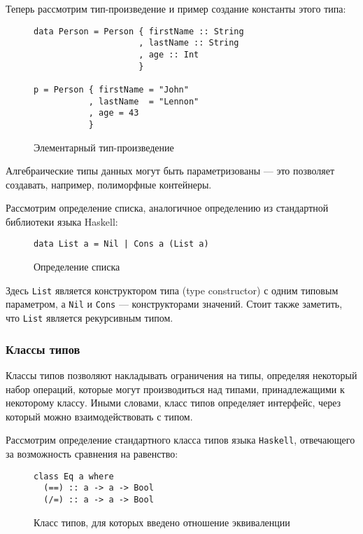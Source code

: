 Теперь рассмотрим тип-произведение и пример создание константы этого типа:

\begin{figure}[h]
\begin{lstlisting}
data Person = Person { firstName :: String
                     , lastName :: String
                     , age :: Int
                     }

p = Person { firstName = "John"
           , lastName  = "Lennon"
           , age = 43
           }
\end{lstlisting}
\caption{Элементарный тип-произведение}
\label{listing:Bool}
\end{figure}

Алгебраические типы данных могут быть параметризованы --- это позволяет создавать, например, полиморфные контейнеры.

Рассмотрим определение списка, аналогичное определению из стандартной библиотеки языка Haskell:

\begin{figure}[h]
\begin{lstlisting}
data List a = Nil | Cons a (List a)
\end{lstlisting}
\caption{Определение списка}
\label{listing:List}
\end{figure}

Здесь \lstinline{List} является конструктором типа (type constructor) с одним типовым параметром, а \lstinline{Nil} и \lstinline{Cons} --- конструкторами значений. Стоит также заметить, что \lstinline{List} является рекурсивным типом.

\subsubsection{Классы типов}

Классы типов позволяют накладывать ограничения на типы, определяя некоторый набор операций, которые могут производиться над типами, принадлежащими к некоторому классу. Иными словами, класс типов определяет интерфейс, через который можно взаимодействовать с типом.

Рассмотрим определение стандартного класса типов языка \lstinline{Haskell}, отвечающего за возможность сравнения на равенство:

\begin{figure}[h]
\begin{lstlisting}
class Eq a where
  (==) :: a -> a -> Bool
  (/=) :: a -> a -> Bool
\end{lstlisting}
\caption{Класс типов, для которых введено отношение эквиваленции}
\label{listing:Eq}
\end{figure}

